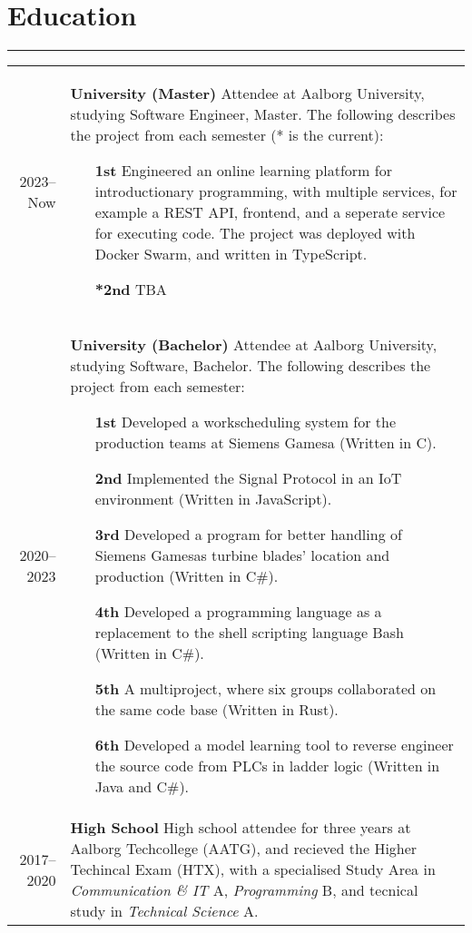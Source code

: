 \documentclass[a4paper]{report}
\def\secsep{\hrule width5cm}
\begin{document}
\newcommand{\p}[1]{\textbf{#1}\mbox{}\newline}
\def\n{\\\\}
\section*{Education}
\secsep
\begin{longtabu} to \textwidth {r|X}
    2023--Now & \p{University (Master)}
    Attendee at Aalborg University, studying Software Engineer, Master. The following describes the project from each semester (* is the current):
    \begin{itemize}[leftmargin=4em]
        \item[\textbf{1st}] Engineered an online learning platform for introductionary programming, with multiple services, for example a REST API, frontend, and a seperate service for executing code. The project was deployed with Docker Swarm, and written in TypeScript.
        \item[\textbf{*2nd}] TBA
    \end{itemize}
    \\
    2020--2023 & \p{University (Bachelor)}
    Attendee at Aalborg University, studying Software, Bachelor. The following describes the project from each semester:
    \begin{itemize}[leftmargin=4em]
        \item[\textbf{1st}] Developed a workscheduling system for the production teams at Siemens Gamesa (Written in C).
        \item[\textbf{2nd}] Implemented the Signal Protocol in an IoT environment (Written in JavaScript).
        \item[\textbf{3rd}] Developed a program for better handling of Siemens Gamesas turbine blades' location and production (Written in C\#).
        \item[\textbf{4th}] Developed a programming language as a replacement to the shell scripting language Bash (Written in C\#).
        \item[\textbf{5th}] A multiproject, where six groups collaborated on the same code base (Written in Rust).
        \item[\textbf{6th}] Developed a model learning tool to reverse engineer the source code from PLCs in ladder logic (Written in Java and C\#).
    \end{itemize}
    \\
    2017--2020 & \p{High School} 
    High school attendee for three years at Aalborg Techcollege (AATG), and recieved the Higher
    Techincal Exam (HTX), with a specialised Study Area in \textit{Communication \& IT} A,
    \textit{Programming} B, and tecnical study in \textit{Technical Science} A.
\end{longtabu}
\end{document}
